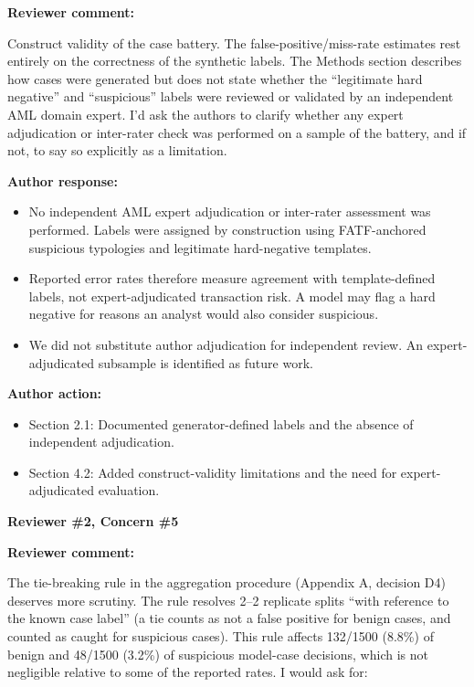 \documentclass[11pt]{article}
\newcommand{\rvcomment}[1]{{\color{ReviewerGreen}#1}}
\newcommand{\concern}[1]{\textbf{\color{ReviewerGreen}#1}}
\begin{document}
\concern{Reviewer comment:}

\rvcomment{Construct validity of the case battery. The false-positive/miss-rate estimates rest entirely on the correctness of the synthetic labels. The Methods section describes how cases were generated but does not state whether the ``legitimate hard negative'' and ``suspicious'' labels were reviewed or validated by an independent AML domain expert. I'd ask the authors to clarify whether any expert adjudication or inter-rater check was performed on a sample of the battery, and if not, to say so explicitly as a limitation.}

\textbf{Author response:}

\begin{itemize}

\item No independent AML expert adjudication or inter-rater assessment was performed. Labels were assigned by construction using FATF-anchored suspicious typologies and legitimate hard-negative templates.

\item Reported error rates therefore measure agreement with template-defined labels, not expert-adjudicated transaction risk. A model may flag a hard negative for reasons an analyst would also consider suspicious.

\item We did not substitute author adjudication for independent review. An expert-adjudicated subsample is identified as future work.

\end{itemize}

\textbf{Author action:}

\begin{itemize}

\item Section 2.1: Documented generator-defined labels and the absence of independent adjudication.

\item Section 4.2: Added construct-validity limitations and the need for expert-adjudicated evaluation.

\end{itemize}

\vspace{12pt}
\concern{Reviewer \#2, Concern \#5}

\concern{Reviewer comment:}

\rvcomment{The tie-breaking rule in the aggregation procedure (Appendix A, decision D4) deserves more scrutiny. The rule resolves 2--2 replicate splits ``with reference to the known case label'' (a tie counts as not a false positive for benign cases, and counted as caught for suspicious cases). This rule affects 132/1500 (8.8\%) of benign and 48/1500 (3.2\%) of suspicious model-case decisions, which is not negligible relative to some of the reported rates. I would ask for:}
\end{document}
